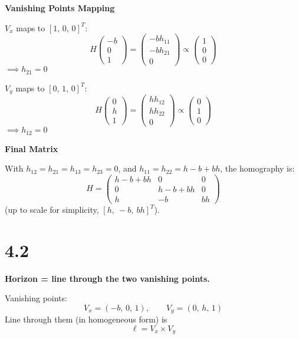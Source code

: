 \documentclass[12pt]{article}
\begin{document}
    \textbf{Vanishing Points Mapping}

    $V_x$ maps to $[1,\, 0,\, 0]^T$:
    \[
    H \begin{pmatrix} -b \\ 0 \\ 1 \end{pmatrix} = \begin{pmatrix} -b h_{11} \\ -b h_{21} \\ 0 \end{pmatrix} \propto \begin{pmatrix} 1 \\ 0 \\ 0 \end{pmatrix}
    \]
    $\implies h_{21} = 0$

    $V_y$ maps to $[0,\, 1,\, 0]^T$:
    \[
    H \begin{pmatrix} 0 \\ h \\ 1 \end{pmatrix} = \begin{pmatrix} h h_{12} \\ h h_{22} \\ 0 \end{pmatrix} \propto \begin{pmatrix} 0 \\ 1 \\ 0 \end{pmatrix}
    \]
    $\implies h_{12} = 0$

    \textbf{Final Matrix}

    With $h_{12} = h_{21} = h_{13} = h_{23} = 0$, and $h_{11} = h_{22} = h - b + bh$, the homography is:
    \[
    H = \begin{pmatrix}
    h - b + bh & 0 & 0 \\
    0 & h - b + bh & 0 \\
    h & -b & bh
    \end{pmatrix}
    \]
    (up to scale for simplicity, $[h,\ -b,\ bh]^T$).

    \section*{4.2}
    \textbf{Horizon = line through the two vanishing points.}

    Vanishing points: 
    \[
    V_x = (-b,\, 0,\, 1), \qquad V_y = (0,\, h,\, 1)
    \]
    Line through them (in homogeneous form) is 
    \[
    \ell = V_x \times V_y
    \]
\end{document}

